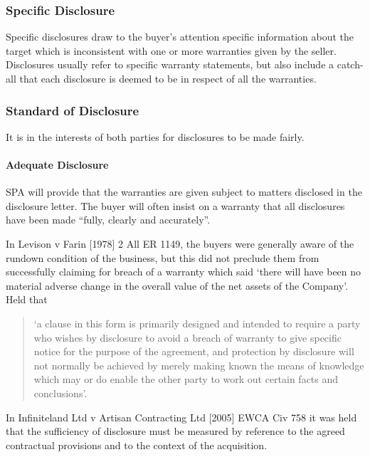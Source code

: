 \documentclass[
]{article}
\begin{document}
\hypertarget{specific-disclosure}{%
\subsubsection{Specific Disclosure}\label{specific-disclosure}}

Specific disclosures draw to the buyer's attention specific information
about the target which is inconsistent with one or more warranties given
by the seller. Disclosures usually refer to specific warranty
statements, but also include a catch-all that each disclosure is deemed
to be in respect of all the warranties.

\hypertarget{standard-of-disclosure}{%
\subsubsection{Standard of Disclosure}\label{standard-of-disclosure}}

It is in the interests of both parties for disclosures to be made
fairly.

\hypertarget{adequate-disclosure}{%
\paragraph{Adequate Disclosure}\label{adequate-disclosure}}

SPA will provide that the warranties are given subject to matters
disclosed in the disclosure letter. The buyer will often insist on a
warranty that all disclosures have been made ``fully, clearly and
accurately''.

In Levison v Farin {[}1978{]} 2 All ER 1149, the buyers were generally
aware of the rundown condition of the business, but this did not
preclude them from successfully claiming for breach of a warranty which
said `there will have been no material adverse change in the overall
value of the net assets of the Company'. Held that

\begin{quote}
`a clause in this form is primarily designed and intended to require a
party who wishes by disclosure to avoid a breach of warranty to give
specific notice for the purpose of the agreement, and protection by
disclosure will not normally be achieved by merely making known the
means of knowledge which may or do enable the other party to work out
certain facts and conclusions'.
\end{quote}

In Infiniteland Ltd v Artisan Contracting Ltd {[}2005{]} EWCA Civ 758 it
was held that the sufficiency of disclosure must be measured by
reference to the agreed contractual provisions and to the context of the
acquisition.
\end{document}
